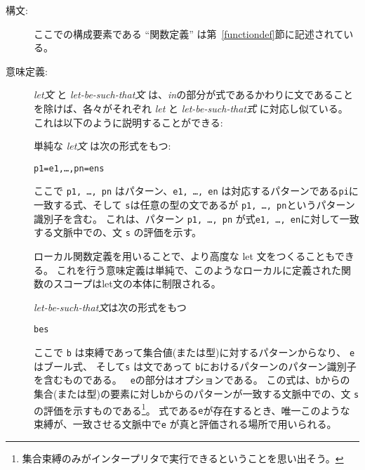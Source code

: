 \documentclass[\pformat,12pt]{jarticle}
\begin{document}
\begin{description}
\item[構文:]





 ここでの構成要素である ``関数定義'' は第~\ref{functiondef}節に記述されている。

\item[意味定義:]  {\it let文} と {\it let-be-such-that文} は、{\it in}の部分が式であるかわりに文であることを除けば、各々がそれぞれ {\it let} と {\it let-be-such-that式} に対応し似ている。
これは以下のように説明することができる:

  単純な {\it let文} は次の形式をもつ:
  \begin{alltt}
     p1 = e1, \ldots, pn = en  s
  \end{alltt}
ここで {\tt p1, \ldots, pn} はパターン、{\tt e1, \ldots, en} は対応するパターンである{\tt pi}に一致する式、そして {\tt s}は任意の型の文であるが {\tt  p1, \ldots, pn}というパターン識別子を含む。 
これは、パターン {\tt p1, \ldots, pn} が式{\tt e1, \ldots, en}に対して一致する文脈中での、文 {\tt s} の評価を示す。

ローカル関数定義を用いることで、より高度な let 文をつくることもできる。
これを行う意味定義は単純で、このようなローカルに定義された関数のスコープはlet文の本体に制限される。


  {\it let-be-such-that文}は次の形式をもつ
  \begin{alltt}
     b  e  s
  \end{alltt}
ここで {\tt b} は束縛であって集合値(または型)に対するパターンからなり、 {\tt  e} はブール式、 そして{\tt s} は文であって {\tt b}におけるパターンのパターン識別子を含むものである。 
 {\tt {} e}の部分はオプションである。
この式は、{\tt b}からの集合(または型)の要素に対し{\tt b}からのパターンが一致する文脈中での、文 {\tt s} の評価を示すものである\footnote{集合束縛のみがインタープリタで実行できるということを思い出そう。}。 
 式である{\tt e}が存在するとき、唯一このような束縛が、一致させる文脈中で{\tt e} が真と評価される場所で用いられる。
     

\end{description}
\end{document}
